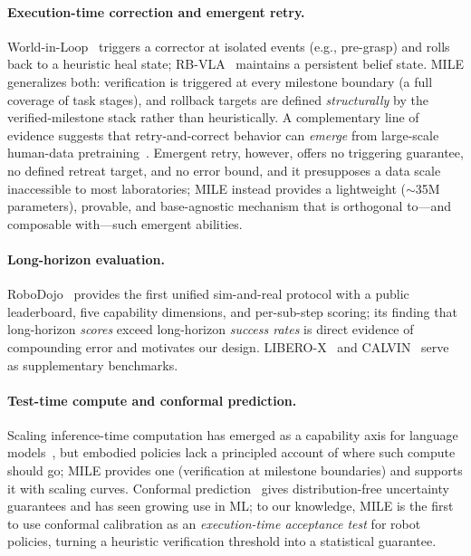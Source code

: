 \documentclass{article}
\newcommand{\mile}{\textsc{MILE}}
\begin{document}
\paragraph{Execution-time correction and emergent retry.}
World-in-Loop~\cite{worldinloop} triggers a corrector at isolated events (e.g., pre-grasp) and rolls back to a heuristic heal state; RB-VLA~\cite{rbvla} maintains a persistent belief state. \mile{} generalizes both: verification is triggered at every milestone boundary (a full coverage of task stages), and rollback targets are defined \emph{structurally} by the verified-milestone stack rather than heuristically. A complementary line of evidence suggests that retry-and-correct behavior can \emph{emerge} from large-scale human-data pretraining~\cite{liber0}. Emergent retry, however, offers no triggering guarantee, no defined retreat target, and no error bound, and it presupposes a data scale inaccessible to most laboratories; \mile{} instead provides a lightweight ($\sim$35M parameters), provable, and base-agnostic mechanism that is orthogonal to---and composable with---such emergent abilities.

\paragraph{Long-horizon evaluation.}
RoboDojo~\cite{robodojo} provides the first unified sim-and-real protocol with a public leaderboard, five capability dimensions, and per-sub-step scoring; its finding that long-horizon \emph{scores} exceed long-horizon \emph{success rates} is direct evidence of compounding error and motivates our design. LIBERO-X~\cite{libero_x} and CALVIN~\cite{calvin} serve as supplementary benchmarks.

\paragraph{Test-time compute and conformal prediction.}
Scaling inference-time computation has emerged as a capability axis for language models~\cite{testtime}, but embodied policies lack a principled account of where such compute should go; \mile{} provides one (verification at milestone boundaries) and supports it with scaling curves. Conformal prediction~\cite{conformal} gives distribution-free uncertainty guarantees and has seen growing use in ML; to our knowledge, \mile{} is the first to use conformal calibration as an \emph{execution-time acceptance test} for robot policies, turning a heuristic verification threshold into a statistical guarantee.
\end{document}
